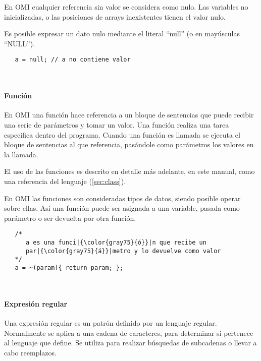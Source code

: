 En OMI cualquier referencia sin valor se considera como nulo. Las variables no inicializadas, o las posiciones de arrays inexistentes tienen el valor nulo. 

Es posible expresar un dato nulo mediante el literal ``null'' (o en mayúsculas ``NULL''). \\

\begin{lstlisting}
   a = null; // a no contiene valor
\end{lstlisting} 
\hfill\\

\paragraph{Función}\label{sec:type_func}
En OMI una función hace referencia a un bloque de sentencias que puede recibir una serie de parámetros y tomar un valor. Una función realiza una tarea específica dentro del programa.
Cuando una función es llamada se ejecuta el bloque de sentencias al que referencia, pasándole como parámetros los valores en la llamada. 

El uso de las funciones es descrito en detalle más adelante, en este manual, como una referencia del lenguaje (\autoref{sec:class}). 

En OMI las funciones son consideradas tipos de datos, siendo posible operar sobre ellas. Así una función puede ser asignada a una variable, pasada como parámetro 
o ser devuelta por otra función. \\

\begin{lstlisting}
   /*
      a es una funci|{\color{gray75}{ó}}|n que recibe un 
      par|{\color{gray75}{á}}|metro y lo devuelve como valor
   */
   a = ~(param){ return param; }; 
\end{lstlisting} 
\hfill\\


\paragraph{Expresión regular}
Una expresión regular es un patrón definido por un lenguaje regular. Normalmente se aplica a una cadena de caracteres, para 
determinar si pertenece al lenguaje que define. Se utiliza para realizar búsquedas de subcadenas o llevar a cabo reemplazos.

